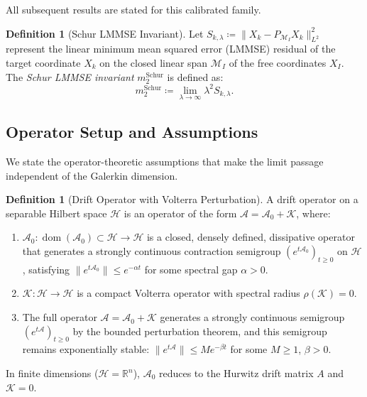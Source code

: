 \documentclass[11pt]{amsart}
\theoremstyle{plain}
\theoremstyle{definition}
\newtheorem{definition}[theorem]{Definition}
\theoremstyle{remark}
\begin{document}
    All subsequent results are stated for this calibrated family.

    \begin{definition}[Schur LMMSE Invariant]
        \label{def:schur_invariant}
        Let $S_{k,\lambda} \coloneqq \|X_k - P_{\mathcal{M}_I} X_k\|_{L^2}^2$ represent the linear minimum mean squared error (LMMSE) residual of the target coordinate $X_k$ on the closed linear span $\mathcal{M}_I$ of the free coordinates $X_I$. The \emph{Schur LMMSE invariant} $m_2^{\mathrm{Schur}}$ is defined as:
        \begin{equation}
            \label{eq:m2_schur_definition}
            m_2^{\mathrm{Schur}} \coloneqq \lim_{\lambda\to\infty} \lambda^2 S_{k,\lambda}.
        \end{equation}
    \end{definition}

    \subsection{Operator Setup and Assumptions}
    \label{sec:setup:assumptions}

    We state the operator-theoretic assumptions that make the limit passage independent of the Galerkin dimension.

    \begin{definition}[Drift Operator with Volterra Perturbation]
        \label{def:drift_operator}
        A drift operator on a separable Hilbert space $\mathcal{H}$ is an operator of the form $\mathcal{A} = \mathcal{A}_0 + \mathcal{K}$, where:
        \begin{enumerate}
            \item[(i)] $\mathcal{A}_0: \operatorname{dom}(\mathcal{A}_0) \subset \mathcal{H} \to \mathcal{H}$ is a closed, densely defined, dissipative operator that generates a strongly continuous contraction semigroup $(e^{t\mathcal{A}_0})_{t \ge 0}$ on $\mathcal{H}$, satisfying $\|e^{t\mathcal{A}_0}\| \le e^{-\alpha t}$ for some spectral gap $\alpha > 0$.
            \item[(ii)] $\mathcal{K}: \mathcal{H} \to \mathcal{H}$ is a compact Volterra operator with spectral radius $\rho(\mathcal{K}) = 0$.
            \item[(iii)] The full operator $\mathcal{A} = \mathcal{A}_0 + \mathcal{K}$ generates a strongly continuous semigroup $(e^{t\mathcal{A}})_{t \ge 0}$ by the bounded perturbation theorem, and this semigroup remains exponentially stable: $\|e^{t\mathcal{A}}\| \le M e^{-\beta t}$ for some $M \ge 1$, $\beta > 0$.
        \end{enumerate}
        In finite dimensions ($\mathcal{H} = \mathbb{R}^n$), $\mathcal{A}_0$ reduces to the Hurwitz drift matrix $A$ and $\mathcal{K} = 0$.
    \end{definition}
\end{document}
